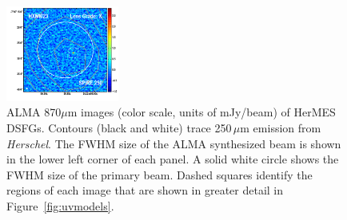 \documentclass[iop]{emulateapj}
\begin{document}
\begin{figure}[!tbp]
\begin{centering}
\includegraphics[width=0.331\textwidth]{../Figures/overlays/HXMM23_870_250.pdf}
\end{centering}

\caption{ ALMA 870$\mu$m images (color scale, units of mJy/beam) of HerMES
DSFGs.  Contours (black and white) trace 250$\,\mu$m emission from {\it
Herschel}.  The FWHM size of the ALMA synthesized beam is shown in the lower
left corner of each panel.  A solid white circle shows the FWHM size of the
primary beam.  Dashed squares identify the regions of each image that are shown
in greater detail in Figure~\ref{fig:uvmodels}.  \label{fig:imaging}}
\addtocounter{figure}{-1}

\end{figure}
\end{document}
